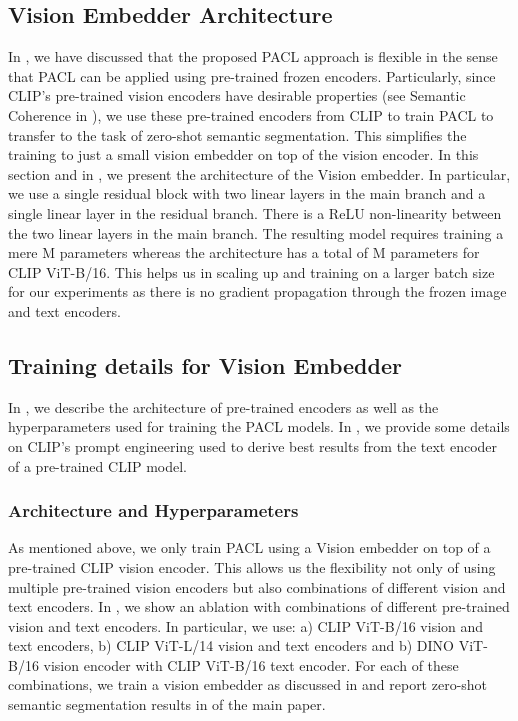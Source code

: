 \documentclass[10pt,twocolumn,letterpaper]{article}
\begin{document}
\subsection {Vision Embedder Architecture}
\label{app:vision_embedder_architecture}

In , we have discussed that the proposed PACL approach is flexible in the sense that PACL can be applied using pre-trained frozen encoders. Particularly, since CLIP's pre-trained vision encoders have desirable properties (see Semantic Coherence in ), we use these pre-trained encoders from CLIP to train PACL to transfer to the task of zero-shot semantic segmentation. This simplifies the training to just a small vision embedder on top of the vision encoder. In this section and in , we present the architecture of the Vision embedder. In particular, we use a single residual block with two linear layers in the main branch and a single linear layer in the residual branch. There is a ReLU non-linearity between the two linear layers in the main branch. The resulting model requires training a mere M parameters whereas the architecture has a total of M parameters for CLIP ViT-B/16. This helps us in scaling up and training on a larger batch size for our experiments as there is no gradient propagation through the frozen image and text encoders.

\subsection {Training details for Vision Embedder}
\label{app:training_details}

In , we describe the architecture of pre-trained encoders as well as the hyperparameters used for training the PACL models. In , we provide some details on CLIP's prompt engineering used to derive best results from the text encoder of a pre-trained CLIP model.

\subsubsection{Architecture and Hyperparameters}
\label{app:architecture_hypers}

As mentioned above, we only train PACL using a Vision embedder on top of a pre-trained CLIP vision encoder. This allows us the flexibility not only of using multiple pre-trained vision encoders but also combinations of different vision and text encoders. In , we show an ablation with combinations of different pre-trained vision and text encoders. In particular, we use: a) CLIP ViT-B/16 vision and text encoders, b) CLIP ViT-L/14 vision and text encoders and b) DINO ViT-B/16 vision encoder with CLIP ViT-B/16 text encoder. For each of these combinations, we train a vision embedder as discussed in  and report zero-shot semantic segmentation results in  of the main paper.
\end{document}
